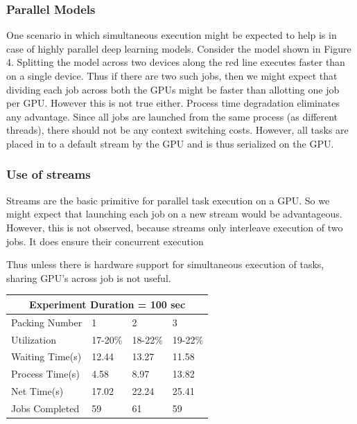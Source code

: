 \subsubsection{Parallel Models}
One scenario in which simultaneous execution might be expected to help is in case of highly parallel deep learning models. Consider the model shown in Figure 4. Splitting the model across two devices along the red line executes faster than on a single device. Thus if there are two such jobs, then we might expect that dividing each job across both the GPUs might be faster than allotting one job per GPU. However this is not true either. Process time degradation eliminates any advantage. Since all jobs are launched from the same process (as different threads), there should not be any context switching costs. However, all tasks are placed in to a default stream by the GPU and is thus serialized on the GPU.

\subsubsection{Use of streams}
Streams are the basic primitive for parallel task execution on a GPU. So we might expect that launching each job on a new stream would be advantageous. However, this is not observed, because streams only interleave execution of two jobs. It does ensure their concurrent execution

Thus unless there is hardware support for simultaneous execution of tasks, sharing GPU's across job is not useful.



\vspace{0.5cm}
\begin{tabular}{ |p{3cm}||p{1cm}|p{1cm}|p{1cm}|  }
 \hline
 \multicolumn{4}{|c|}{Experiment Duration = 100 sec} \\
 \hline
 Packing Number & 1 & 2& 3\\
 \hline
 Utilization   & 17-20\%    & 18-22\%  &   19-22\%  \\
 Waiting Time(s)   & 12.44    &13.27&   11.58\\
 Process Time(s)&  4.58  & 8.97   & 13.82\\
 Net Time(s) &17.02 & 22.24&  25.41\\
 Jobs Completed    &59 & 61&  59\\
 \hline
\end{tabular}

